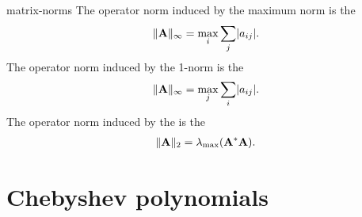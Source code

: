\begin{Example}{matrix-norms}
  The operator norm induced by the maximum norm is the 
  \begin{gather}
    \lVert\mathbf A\rVert_\infty = \max_i \sum_j \lvert a_{ij}\rvert.
  \end{gather}
  The operator norm induced by the 1-norm is the 
  \begin{gather}
    \lVert\mathbf A\rVert_\infty = \max_j \sum_i \lvert a_{ij}\rvert.
  \end{gather}
  The operator norm induced by the  is the 
  \begin{gather}
    \lVert\mathbf A\rVert_2 = \lambda_{\max}(\mathbf A^*\mathbf A).
  \end{gather}
\end{Example}

\section{Chebyshev polynomials}




\printindex

